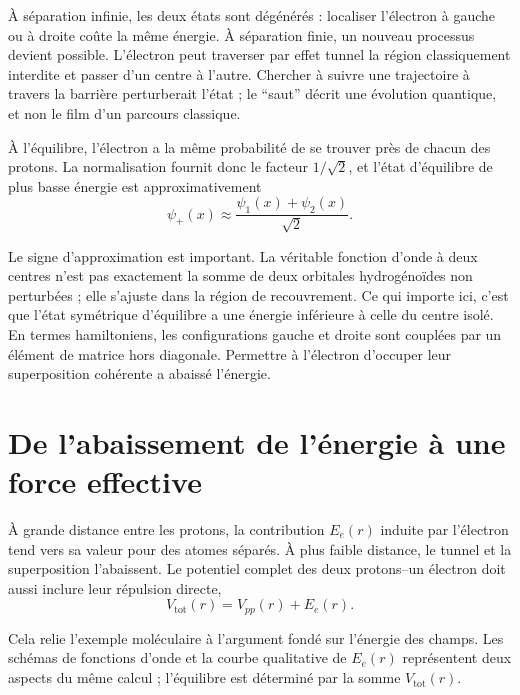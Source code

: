 À séparation infinie, les deux états sont dégénérés : localiser l’électron à gauche ou à droite coûte la même énergie. À séparation finie, un nouveau processus devient possible. L’électron peut traverser par effet tunnel la région classiquement interdite et passer d’un centre à l’autre. Chercher à suivre une trajectoire à travers la barrière perturberait l’état ; le ``saut'' décrit une évolution quantique, et non le film d’un parcours classique.

À l’équilibre, l’électron a la même probabilité de se trouver près de chacun des protons. La normalisation fournit donc le facteur \(1/\sqrt2\), et l’état d’équilibre de plus basse énergie est approximativement
\begin{equation}
\psi_+(x)\approx \frac{\psi_1(x)+\psi_2(x)}{\sqrt2}.
\end{equation}

Le signe d’approximation est important. La véritable fonction d’onde à deux centres n’est pas exactement la somme de deux orbitales hydrogénoïdes non perturbées ; elle s’ajuste dans la région de recouvrement. Ce qui importe ici, c’est que l’état symétrique d’équilibre a une énergie inférieure à celle du centre isolé. En termes hamiltoniens, les configurations gauche et droite sont couplées par un élément de matrice hors diagonale. Permettre à l’électron d’occuper leur superposition cohérente a abaissé l’énergie.

\section{De l’abaissement de l’énergie à une force effective}

À grande distance entre les protons, la contribution \(E_e(r)\) induite par l’électron tend vers sa valeur pour des atomes séparés. À plus faible distance, le tunnel et la superposition l’abaissent. Le potentiel complet des deux protons--un électron doit aussi inclure leur répulsion directe,
\begin{equation}
V_{\mathrm{tot}}(r)=V_{pp}(r)+E_e(r).
\end{equation}

Cela relie l’exemple moléculaire à l’argument fondé sur l’énergie des champs. Les schémas de fonctions d’onde et la courbe qualitative de \(E_e(r)\) représentent deux aspects du même calcul ; l’équilibre est déterminé par la somme \(V_{\mathrm{tot}}(r)\).

